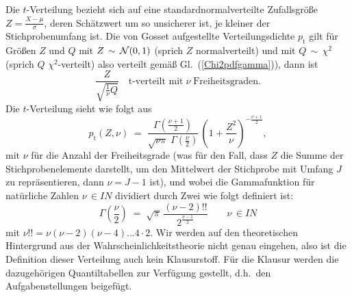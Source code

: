 Die $t$-Verteilung bezieht sich auf eine standardnormalverteilte Zufallsgröße $Z = \frac{X - \mu}{\sigma}$,
deren Schätzwert um so unsicherer ist, je kleiner der Stichprobenumfang ist. Die von Gosset aufgestellte
Verteilungsdichte $p_\mathrm{t}$ gilt für Größen $Z$ und $Q$ mit $Z \, \sim \, {\cal N}(0,1)$
(sprich $Z$ normalverteilt) und mit $Q \, \sim \, \chi^2$ (sprich $Q$ $\chi^2$-verteilt) also
verteilt gemäß Gl.~(\ref{Chi2pdfgamma})), dann ist
\begin{equation}
\frac{Z}{\sqrt{\frac{1}{\nu} Q}} \quad \text{t-verteilt mit} \; \nu \; \text{Freiheitsgraden.}
\end{equation}
Die $t$-Verteilung sieht wie folgt aus
\begin{equation}
p_\mathrm{t}(Z,\nu) \; = \;
{\frac {\Gamma \left({\frac {\nu+1}{2}}\right)}{{\sqrt {\nu \pi }} \;
\Gamma \left({\frac {\nu}{2}}\right)}} \, \left(1+{\frac {Z^2}{\nu}}\right)^{-{\frac {\nu+1}{2}}} ,
\end{equation}
mit $\nu$ für die Anzahl der Freiheitsgrade (was für den Fall, dass $Z$
die Summe der Stichprobenelemente darstellt, um den Mittelwert der Stichprobe mit Umfang $J$
zu repräsentieren, dann $\nu = J-1$ ist), und wobei
die Gammafunktion für natürliche Zahlen $\nu \, \in I \!\! N$ dividiert durch Zwei
wie folgt definiert ist:
\begin{equation}
\Gamma \left({\frac{\nu}{2}}\right) \; = \;
\sqrt{\pi} \, \frac{(\nu-2)!!}{ 2^{\frac{\nu-1}{2}} } \qquad \nu \, \in I \!\! N
\label{GammaHalfInt}
\end{equation}
mit $\nu!! = \nu (\nu-2) (\nu-4) \dots 4 \cdot 2$.
Wir werden auf den theoretischen Hintergrund aus der Wahrscheinlichkeitstheorie nicht
genau eingehen, also ist die Definition dieser Verteilung auch kein Klausurstoff.
Für die Klausur werden die dazugehörigen Quantiltabellen zur Verfügung gestellt, d.h.\
den Aufgabenstellungen beigefügt.

